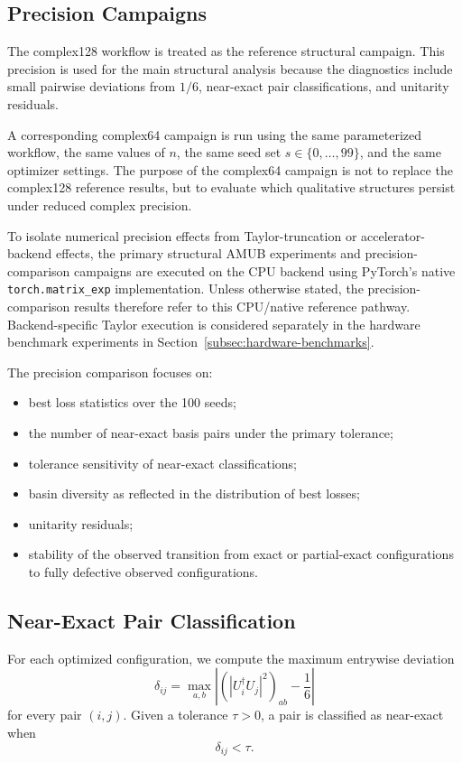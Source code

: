 \documentclass[a4paper,twocolumn,11pt,amsfonts,amssymb]{quantumarticle}
\begin{document}
\subsection{Precision Campaigns}

The complex128 workflow is treated as the reference structural campaign. This precision is used for the main structural analysis because the diagnostics include small pairwise deviations from \(1/6\), near-exact pair classifications, and unitarity residuals.

A corresponding complex64 campaign is run using the same parameterized workflow, the same values of \(n\), the same seed set \(s\in\{0,\ldots,99\}\), and the same optimizer settings. The purpose of the complex64 campaign is not to replace the complex128 reference results, but to evaluate which qualitative structures persist under reduced complex precision.

To isolate numerical precision effects from Taylor-truncation or accelerator-backend effects, the primary structural AMUB experiments and precision-comparison campaigns are executed on the CPU backend using PyTorch's native \texttt{torch.matrix\_exp} implementation. Unless otherwise stated, the precision-comparison results therefore refer to this CPU/native reference pathway. Backend-specific Taylor execution is considered separately in the hardware benchmark experiments in Section~\ref{subsec:hardware-benchmarks}.

The precision comparison focuses on:
\begin{itemize}
    \item best loss statistics over the 100 seeds;
    \item the number of near-exact basis pairs under the primary tolerance;
    \item tolerance sensitivity of near-exact classifications;
    \item basin diversity as reflected in the distribution of best losses;
    \item unitarity residuals;
    \item stability of the observed transition from exact or partial-exact configurations to fully defective observed configurations.
\end{itemize}

\subsection{Near-Exact Pair Classification}

For each optimized configuration, we compute the maximum entrywise deviation
\begin{equation*}
    \delta_{ij}
    =
    \max_{a,b}
    \left|
    \left(|U_i^\dagger U_j|^2\right)_{ab}
    -
    \frac{1}{6}
    \right|
\end{equation*}
for every pair $(i,j)$. Given a tolerance \(\tau>0\), a pair is classified as near-exact when
\begin{equation*}
    \delta_{ij} < \tau .
\end{equation*}
\end{document}
